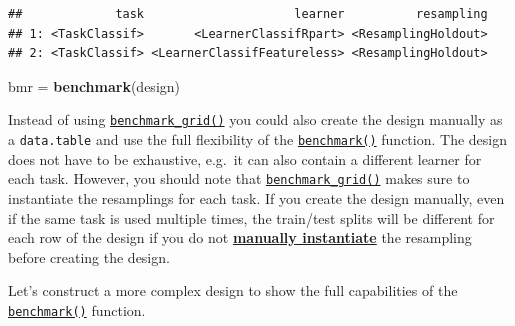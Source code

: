 \documentclass[]{scrbook}
\newenvironment{Shaded}{\begin{snugshade}}{\end{snugshade}}
\newcommand{\KeywordTok}[1]{\textcolor[rgb]{0.13,0.29,0.53}{\textbf{#1}}}
\newcommand{\NormalTok}[1]{#1}
\newcommand{\StringTok}[1]{\textcolor[rgb]{0.31,0.60,0.02}{#1}}
\renewenvironment{Shaded} {\begin{snugshade}\small} {\end{snugshade}}
\begin{document}
\begin{verbatim}
##             task                     learner          resampling
## 1: <TaskClassif>       <LearnerClassifRpart> <ResamplingHoldout>
## 2: <TaskClassif> <LearnerClassifFeatureless> <ResamplingHoldout>
\end{verbatim}

\begin{Shaded}
\begin{Highlighting}[]
\NormalTok{bmr =}\StringTok{ }\KeywordTok{benchmark}\NormalTok{(design)}
\end{Highlighting}
\end{Shaded}

Instead of using \href{https://mlr3.mlr-org.com/reference/benchmark_grid.html}{\texttt{benchmark\_grid()}} you could also create the design manually as a \texttt{data.table} and use the full flexibility of the \href{https://mlr3.mlr-org.com/reference/benchmark.html}{\texttt{benchmark()}} function.
The design does not have to be exhaustive, e.g.~it can also contain a different learner for each task.
However, you should note that \href{https://mlr3.mlr-org.com/reference/benchmark_grid.html}{\texttt{benchmark\_grid()}} makes sure to instantiate the resamplings for each task.
If you create the design manually, even if the same task is used multiple times, the train/test splits will be different for each row of the design if you do not \protect\hyperlink{resampling-inst}{\textbf{manually instantiate}} the resampling before creating the design.

Let's construct a more complex design to show the full capabilities of the \href{https://mlr3.mlr-org.com/reference/benchmark.html}{\texttt{benchmark()}} function.
\end{document}
